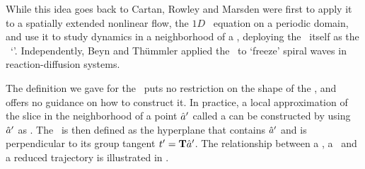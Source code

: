 While this idea goes back to Cartan,
Rowley and Marsden
were first to apply it to a spatially extended nonlinear flow,
the $1D$ \KS\ equation
on a periodic domain, and use it to study dynamics in a neighborhood of
a \reqv, deploying the \reqv\ itself as the \slice\ `\template'.
Independently, Beyn and Th\"{u}mmler applied
the \mslices\ to `freeze' spiral waves in reaction-diffusion systems.

The definition we gave for the \slice\ puts no restriction on the shape of the
\slice, and offers no guidance on how to construct it. In practice, a
local approximation of the slice in the neighborhood of a point ${\hat{a}'}$
called a \emph{\slicePlane} can be constructed by using ${\hat{a}'}$ as
\emph{\template}. The \slicePlane\ is then defined as the hyperplane that
contains ${\hat{a}'}$ and is perpendicular to its group tangent $t'_{}
= \mathbf{T} {\hat{a}'}$. The relationship between a \slicePlane, a \template\ and
a reduced trajectory is illustrated in .


